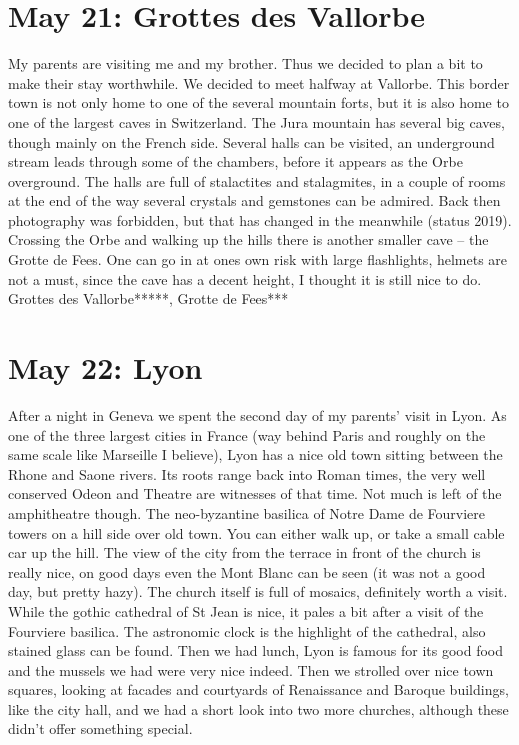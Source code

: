 \section{May 21: Grottes des Vallorbe}
\label{Vallorbe2011}

My parents are visiting me and my brother. Thus we decided to plan a bit to make their stay worthwhile. We decided to meet halfway at Vallorbe. This border town is not only home to one of the several mountain forts, but it is also home to one of the largest caves in Switzerland. The Jura mountain has several big caves, though mainly on the French side. Several halls can be visited, an underground stream leads through some of the chambers, before it appears as the Orbe overground. The halls are full of stalactites and stalagmites, in a couple of rooms at the end of the way several crystals and gemstones can be admired. Back then photography was forbidden, but that has changed in the meanwhile (status 2019). Crossing the Orbe and walking up the hills there is another smaller cave -- the Grotte de Fees. One can go in at ones own risk with large flashlights, helmets are not a must, since the cave has a decent height, I thought it is still nice to do.\\

Grottes des Vallorbe*****, Grotte de Fees***

\section{May 22: Lyon}
\label{Lyon2011}

After a night in Geneva we spent the second day of my parents' visit in Lyon. As one of the three largest cities in France (way behind Paris and roughly on the same scale like Marseille I believe), Lyon has a nice old town sitting between the Rhone and Saone rivers. Its roots range back into Roman times, the very well conserved Odeon and Theatre are witnesses of that time. Not much is left of the amphitheatre though. The neo-byzantine basilica of Notre Dame de Fourviere towers on a hill side over old town. You can either walk up, or take a small cable car up the hill. The view of the city from the terrace in front of the church is really nice, on good days even the Mont Blanc can be seen (it was not a good day, but pretty hazy). The church itself is full of mosaics, definitely worth a visit. While the gothic cathedral of St Jean is nice, it pales a bit after a visit of the Fourviere basilica. The astronomic clock is the highlight of the cathedral, also stained glass can be found. Then we had lunch, Lyon is famous for its good food and the mussels we had were very nice indeed. Then we strolled over nice town squares, looking at facades and courtyards of Renaissance and Baroque buildings, like the city hall, and we had a short look into two more churches, although these didn't offer something special.\\

